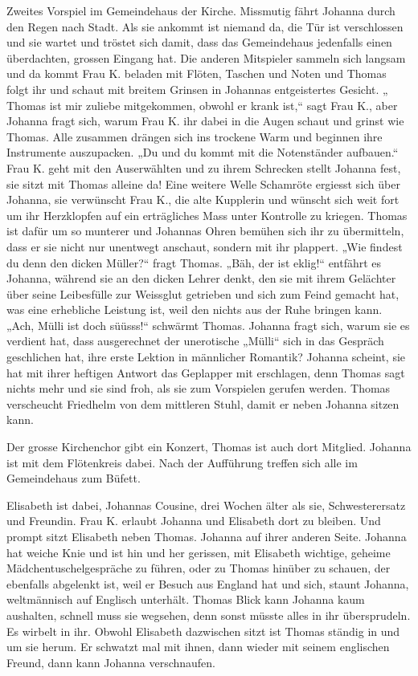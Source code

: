 \documentclass[10pt,titlepage,a5paper]{book}
\begin{document}
 Zweites Vorspiel im Gemeindehaus der Kirche. Missmutig fährt Johanna durch den Regen nach Stadt. Als sie ankommt ist niemand da, die Tür ist verschlossen und sie wartet und tröstet sich damit, dass das Gemeindehaus jedenfalls einen überdachten, grossen Eingang hat. Die anderen Mitspieler sammeln sich langsam und da kommt Frau K. beladen mit  Flöten, Taschen und Noten und Thomas folgt ihr und schaut mit breitem Grinsen in Johannas entgeistertes Gesicht. „ Thomas ist mir zuliebe mitgekommen, obwohl er krank ist,“ sagt Frau K., aber Johanna fragt sich, warum Frau K.  ihr dabei in die Augen schaut und grinst wie Thomas. Alle zusammen drängen sich ins trockene Warm und beginnen ihre Instrumente auszupacken. „Du und du kommt mit die Notenständer aufbauen.“ Frau K. geht mit den Auserwählten und zu ihrem Schrecken stellt Johanna fest, sie sitzt mit Thomas alleine da! Eine weitere Welle Schamröte ergiesst sich über Johanna, sie verwünscht Frau K., die alte Kupplerin und wünscht sich weit fort um ihr Herzklopfen auf ein erträgliches Mass unter Kontrolle zu kriegen. Thomas ist dafür um so munterer und Johannas Ohren bemühen sich ihr zu übermitteln, dass er sie nicht nur unentwegt anschaut, sondern mit ihr plappert. „Wie findest du denn den dicken Müller?“ fragt Thomas. „Bäh, der ist eklig!“ entfährt es Johanna, während sie an den dicken Lehrer denkt, den sie mit ihrem Gelächter über seine Leibesfülle zur Weissglut getrieben und sich zum Feind gemacht hat, was eine erhebliche Leistung ist, weil den nichts aus der Ruhe bringen kann. „Ach, Mülli ist doch süüsss!“ schwärmt Thomas. Johanna fragt sich, warum sie es verdient hat, dass ausgerechnet der unerotische „Mülli“ sich in das Gespräch geschlichen hat, ihre erste Lektion in männlicher Romantik? Johanna scheint, sie hat mit ihrer heftigen Antwort das Geplapper mit erschlagen, denn Thomas sagt nichts mehr  und sie sind froh, als sie zum Vorspielen gerufen werden. Thomas verscheucht Friedhelm von dem mittleren Stuhl, damit er neben Johanna sitzen kann.
 
Der grosse Kirchenchor gibt ein Konzert, Thomas ist auch dort Mitglied. Johanna ist mit dem Flötenkreis dabei. Nach der Aufführung treffen sich alle im Gemeindehaus zum Büfett.

 Elisabeth ist dabei,  Johannas Cousine, drei Wochen älter als sie, Schwesterersatz und Freundin. Frau K. erlaubt Johanna und Elisabeth dort zu bleiben. Und prompt sitzt Elisabeth neben Thomas. Johanna auf ihrer anderen Seite. Johanna hat weiche Knie und ist hin und her gerissen, mit Elisabeth wichtige, geheime Mädchentuschelgespräche zu führen, oder zu Thomas hinüber zu schauen, der ebenfalls abgelenkt ist, weil er Besuch aus England hat und sich, staunt Johanna, weltmännisch auf Englisch unterhält. 
Thomas Blick kann Johanna kaum aushalten, schnell muss sie wegsehen, denn sonst müsste alles in ihr übersprudeln. Es wirbelt in ihr. Obwohl Elisabeth dazwischen sitzt ist Thomas ständig in und um sie herum. Er schwatzt mal mit ihnen, dann wieder mit seinem englischen Freund, dann kann Johanna verschnaufen. 
\end{document}
